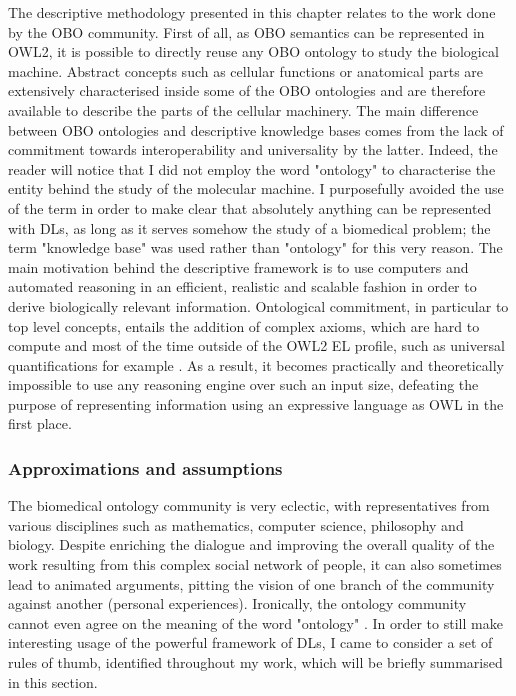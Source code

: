 The descriptive methodology presented in this chapter relates to the work done by the OBO community. First of all, as OBO semantics can be represented in OWL2, it is possible to directly reuse any OBO ontology to study the biological machine. Abstract concepts such as cellular functions or anatomical parts are extensively characterised inside some of the OBO ontologies and are therefore available to describe the parts of the cellular machinery. The main difference between OBO ontologies and descriptive knowledge bases comes from the lack of commitment towards interoperability and universality by the latter. Indeed, the reader will notice that I did not employ the word "ontology" to characterise the entity behind the study of the molecular machine. I purposefully avoided the use of the term in order to make clear that absolutely anything can be represented with DLs, as long as it serves somehow the study of a biomedical problem; the term "knowledge base" was used rather than "ontology" for this very reason. The main motivation behind the descriptive framework is to use computers and automated reasoning in an efficient, realistic and scalable fashion in order to derive biologically relevant information. Ontological commitment, in particular to top level concepts, entails the addition of complex axioms, which are hard to compute and most of the time outside of the OWL2 EL profile, such as universal quantifications for example \citep{krotzsch2012owl}. As a result, it becomes practically and theoretically impossible to use any reasoning engine over such an input size, defeating the purpose of representing information using an expressive language as OWL in the first place.

\subsubsection{Approximations and assumptions}

The biomedical ontology community is very eclectic, with representatives from various disciplines such as mathematics, computer science, philosophy and biology. Despite enriching the dialogue and improving the overall quality of the work resulting from this complex social network of people, it can also sometimes lead to animated arguments, pitting the vision of one branch of the community against another (personal experiences). Ironically, the ontology community cannot even agree on the meaning of the word "ontology" \citep{schulz2013formal}. In order to still make interesting usage of the powerful framework of DLs, I came to consider a set of rules of thumb, identified throughout my work, which will be briefly summarised in this section.

